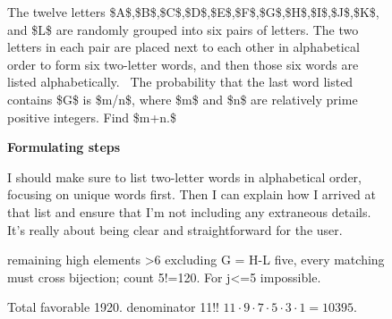 

\begin{figure}[H]
\centering
\setlength{\columnsep}{12pt}
\setlength{\colw}{\dimexpr(\linewidth-\columnsep)/2\relax}
\begin{promptrow}
\caret{}\par\vspace{4pt}
The twelve letters \$A\$,\$B\$,\$C\$,\$D\$,\$E\$,\$F\$,\$G\$,\$H\$,\$I\$,\$J\$,\$K\$, and \$L\$ are randomly grouped into six pairs of letters. The two letters in each pair are placed next to each other in alphabetical order to form six two-letter words, and then those six words are listed alphabetically. \elide\ The probability that the last word listed contains \$G\$ is \$m/n\$, where \$m\$ and \$n\$ are relatively prime positive integers. Find \$m+n.\$
\end{promptrow}
\vspace{12pt}
\noindent
\begin{reasoncol}[equal height group=sfE]
  \caret{}\par\vspace{4pt}
  \raggedright
  \textbf{Formulating steps}\par\vspace{2pt}
    I should make sure to list two-letter words in alphabetical order, focusing on unique words first. Then I can explain how I arrived at that list and ensure that I'm not including any extraneous details. It's really about being clear and straightforward for the user. 
\end{reasoncol}\hspace{\columnsep}%
\begin{reasoncol}[equal height group=sfE]
  \caret{}\par\vspace{4pt}
  \raggedright
  remaining high elements >6 excluding G = H-L five, every matching must cross bijection; count 5!=120. For j<=5 impossible.\par
  Total favorable 1920. denominator 11!! \(11\cdot9\cdot7\cdot5\cdot3\cdot1=10395\).\par

\end{reasoncol}
\end{figure}
